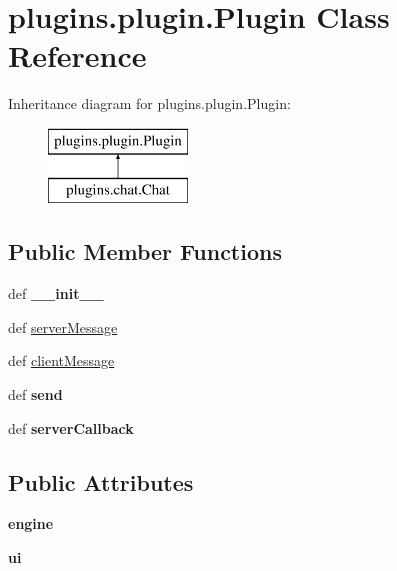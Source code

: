 \hypertarget{classplugins_1_1plugin_1_1_plugin}{\section{plugins.\-plugin.\-Plugin \-Class \-Reference}
\label{classplugins_1_1plugin_1_1_plugin}
}
\-Inheritance diagram for plugins.\-plugin.\-Plugin\-:\begin{figure}[H]
\begin{center}
\leavevmode
\includegraphics[height=2.000000cm]{classplugins_1_1plugin_1_1_plugin}
\end{center}
\end{figure}
\subsection*{\-Public \-Member \-Functions}
\begin{DoxyCompactItemize}
\item 
\hypertarget{classplugins_1_1plugin_1_1_plugin_a66f5c840ac03b9b724fb9734669abdfb}{def {\bfseries \-\_\-\-\_\-init\-\_\-\-\_\-}}\label{classplugins_1_1plugin_1_1_plugin_a66f5c840ac03b9b724fb9734669abdfb}

\item 
def \hyperlink{classplugins_1_1plugin_1_1_plugin_aac06ba69452a3dac4e5950116a34d3ac}{server\-Message}
\item 
def \hyperlink{classplugins_1_1plugin_1_1_plugin_a9647791e5ba3150f5fd82bb359a43d11}{client\-Message}
\item 
\hypertarget{classplugins_1_1plugin_1_1_plugin_a977c6c1cb7ea7cbb54667f8264da135c}{def {\bfseries send}}\label{classplugins_1_1plugin_1_1_plugin_a977c6c1cb7ea7cbb54667f8264da135c}

\item 
\hypertarget{classplugins_1_1plugin_1_1_plugin_aacd26cfe04263a2b1ca70ff9f2c8ae9d}{def {\bfseries server\-Callback}}\label{classplugins_1_1plugin_1_1_plugin_aacd26cfe04263a2b1ca70ff9f2c8ae9d}

\end{DoxyCompactItemize}
\subsection*{\-Public \-Attributes}
\begin{DoxyCompactItemize}
\item 
\hypertarget{classplugins_1_1plugin_1_1_plugin_a27cac3b42754566db40b9cb0109648b4}{{\bfseries engine}}\label{classplugins_1_1plugin_1_1_plugin_a27cac3b42754566db40b9cb0109648b4}

\item 
\hypertarget{classplugins_1_1plugin_1_1_plugin_aac6f72b7299d7727ad2e851fc49d7adb}{{\bfseries ui}}\label{classplugins_1_1plugin_1_1_plugin_aac6f72b7299d7727ad2e851fc49d7adb}

\end{DoxyCompactItemize}
